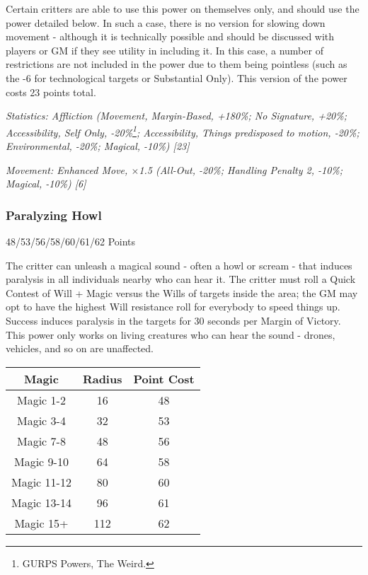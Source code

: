 \begin{multicols*}{3}
	Certain critters are able to use this power on themselves only, and should use the power detailed below. In such a case, there is no version for slowing down movement - although it is technically possible and should be discussed with players or GM if they see utility in including it. In this case, a number of restrictions are not included in the power due to them being pointless (such as the -6 for technological targets or Substantial Only). This version of the power costs 23 points total.
	
	\textcolor{OliveGreen}{\textit{Statistics: Affliction (Movement, Margin-Based, +180\%; No Signature, +20\%;	Accessibility, Self Only, -20\%\footnote{GURPS Powers, The Weird.}; Accessibility, Things predisposed to motion, -20\%; Environmental, -20\%; Magical, -10\%) [23]}}
	
	\textcolor{OliveGreen}{\textit{Movement: Enhanced Move, \(\times\)1.5 (All-Out, -20\%; Handling Penalty 2, -10\%; Magical, -10\%) [6]}}
	

	
	
	
	\subsubsection{Paralyzing Howl}\label{paralyzing_howl}
	\begin{flushright}
		48/53/56/58/60/61/62 Points
	\end{flushright}

	The critter can unleash a magical sound - often a howl or scream - that induces paralysis in all individuals nearby who can hear it. The critter must roll a Quick Contest of Will + Magic versus the Wills of targets inside the area; the GM may opt to have the highest Will resistance roll for everybody to speed things up. Success induces paralysis in the targets for 30 seconds per Margin of Victory. This power only works on living creatures who can hear the sound - drones, vehicles, and so on are unaffected. 
	
	\begin{center}
		\begin{tabular}{|c|c|c|}
			\hline
			Magic & Radius & Point Cost\\
			\hline
			\hline
			Magic 1-2 & 16 & 48 \\
			Magic 3-4 & 32 & 53 \\
			Magic 7-8 & 48 & 56 \\
			Magic 9-10 & 64 & 58 \\
			Magic 11-12 & 80 & 60 \\
			Magic 13-14 & 96 & 61 \\
			Magic 15+ & 112 & 62 \\
			\hline
		\end{tabular}
	\end{center}


\end{multicols*}
